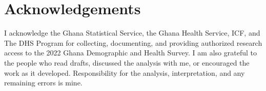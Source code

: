 \chapter*{Acknowledgements}
\begin{singlespace}
I acknowledge the Ghana Statistical Service, the Ghana Health Service, ICF, and The DHS Program for collecting, documenting, and providing authorized research access to the 2022 Ghana Demographic and Health Survey. I am also grateful to the people who read drafts, discussed the analysis with me, or encouraged the work as it developed. Responsibility for the analysis, interpretation, and any remaining errors is mine.
\end{singlespace}
\clearpage
